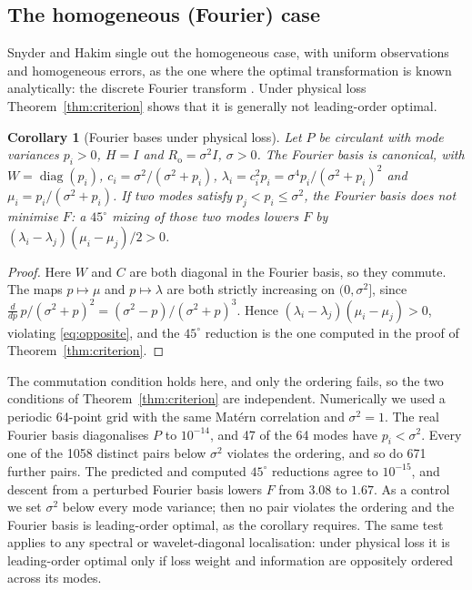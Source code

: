 \documentclass[11pt,a4paper]{article}
\numberwithin{equation}{section}
\newtheorem{corollary}[theorem]{Corollary}
\theoremstyle{remark}\newtheorem{remark}[theorem]{Remark}
\newcommand{\diag}{\operatorname{diag}}
\newcommand{\Rn}{R_{\mathrm o}}
\begin{document}
\subsection{The homogeneous (Fourier) case}

Snyder and Hakim single out the homogeneous case, with uniform observations and homogeneous
errors, as the one where the optimal transformation is known analytically: the discrete
Fourier transform \cite[Section~7]{SnyderHakim2022}. Under physical loss
Theorem~\ref{thm:criterion} shows that it is generally not leading-order optimal.

\begin{corollary}[Fourier bases under physical loss]\label{cor:fourier}
Let \(P\) be circulant with mode variances \(p_i>0\), \(H=I\) and \(\Rn=\sigma^2I\), \(\sigma>0\). The
Fourier basis is canonical, with \(W=\diag(p_i)\), \(c_i=\sigma^2/(\sigma^2+p_i)\),
\(\lambda_i=c_i^2p_i=\sigma^4p_i/(\sigma^2+p_i)^2\) and \(\mu_i=p_i/(\sigma^2+p_i)\). If two modes satisfy
\(p_j<p_i\le\sigma^2\), the Fourier basis does not minimise \(F\): a \(45^\circ\) mixing of those two
modes lowers \(F\) by \((\lambda_i-\lambda_j)(\mu_i-\mu_j)/2>0\).
\end{corollary}
\begin{proof}
Here \(W\) and \(C\) are both diagonal in the Fourier basis, so they commute. The maps
\(p\mapsto\mu\) and \(p\mapsto\lambda\) are both strictly increasing on \((0,\sigma^2]\), since
\(\frac{d}{dp}\,p/(\sigma^2+p)^2=(\sigma^2-p)/(\sigma^2+p)^3\). Hence
\((\lambda_i-\lambda_j)(\mu_i-\mu_j)>0\), violating \eqref{eq:opposite}, and the \(45^\circ\)
reduction is the one computed in the proof of Theorem~\ref{thm:criterion}.
\end{proof}

The commutation condition holds here, and only the ordering fails, so the two conditions of
Theorem~\ref{thm:criterion} are independent. Numerically we used a periodic 64-point grid with
the same Mat\'ern correlation and \(\sigma^2=1\). The real Fourier basis diagonalises \(P\) to
\(10^{-14}\), and 47 of the 64 modes have \(p_i<\sigma^2\). Every one of the 1058 distinct pairs
below \(\sigma^2\) violates the ordering, and so do 671 further pairs. The predicted and computed
\(45^\circ\) reductions agree to \(10^{-15}\), and descent from a perturbed Fourier basis lowers \(F\)
from \(3.08\) to \(1.67\). As a control we set \(\sigma^2\) below every mode variance; then no pair
violates the ordering and the Fourier basis is leading-order optimal, as the corollary requires.
The same test applies to any spectral or wavelet-diagonal localisation: under physical loss it is
leading-order optimal only if loss weight and information are oppositely ordered across its
modes.
\end{document}

